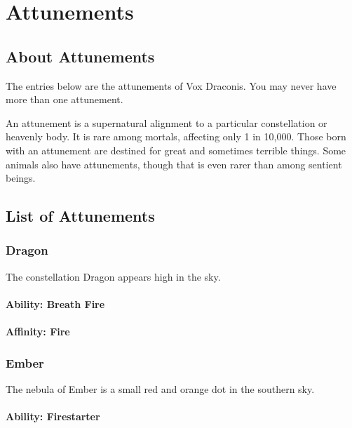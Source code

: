 \chapter{Attunements}

\begin{multicols}{2}

\section{About Attunements}

The entries below are the attunements of Vox Draconis. You may 
never have more than one attunement.

An attunement is a supernatural alignment to a particular 
constellation or heavenly body. It is rare among mortals, 
affecting only 1 in 10,000. Those born with an attunement 
are destined for great and sometimes terrible things. Some 
animals also have attunements, though that is even rarer than 
among sentient beings.

\section{List of Attunements}

\subsection{Dragon}

The constellation Dragon appears high in the sky.

\subsubsection{Ability: Breath Fire}

\subsubsection{Affinity: Fire}

\subsection{Ember}

The nebula of Ember is a small red and orange dot in the southern sky.

\subsubsection{Ability: Firestarter}


\end{multicols}
